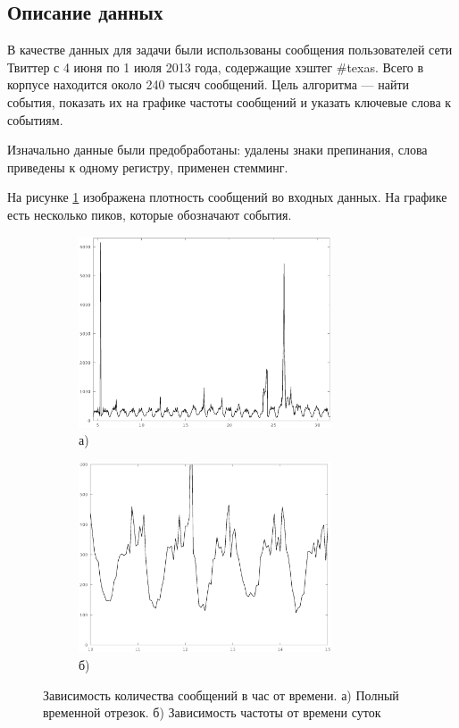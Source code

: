 \documentclass[14pt,a4paper,oneside]{extarticle}
\begin{document}
  \subsection{Описание данных}
  В качестве данных для задачи были использованы сообщения пользователей сети Твиттер с 4 июня по 1 июля 2013 года, содержащие хэштег \#texas. Всего в корпусе находится около 240 тысяч сообщений. Цель алгоритма --- найти события, показать их на графике частоты сообщений и указать ключевые слова к событиям.
  
  Изначально данные были предобработаны: удалены знаки препинания, слова приведены к одному регистру, применен стемминг.
  
  На рисунке \ref{fig:all-freq} изображена плотность сообщений во входных данных. На графике есть несколько пиков, которые обозначают события. 
  \begin{figure}[H]
  \centering
  \begin{subfigure}[b]{0.45 \textwidth}
	  \centering
	  \includegraphics[width=7.5cm]{all-freq.eps}
	  \caption*{а)}
  \end{subfigure}
  \begin{subfigure}[b]{0.45 \textwidth}
	  \centering
	  \includegraphics[width=7.5cm]{all-freq-scaled.eps}
	  \caption*{б)}
  \end{subfigure}  
  \caption{Зависимость количества сообщений в час от времени. а) Полный временной отрезок. б) Зависимость частоты от времени суток}
  \label{fig:all-freq}
  \end{figure}
  
\end{document}
